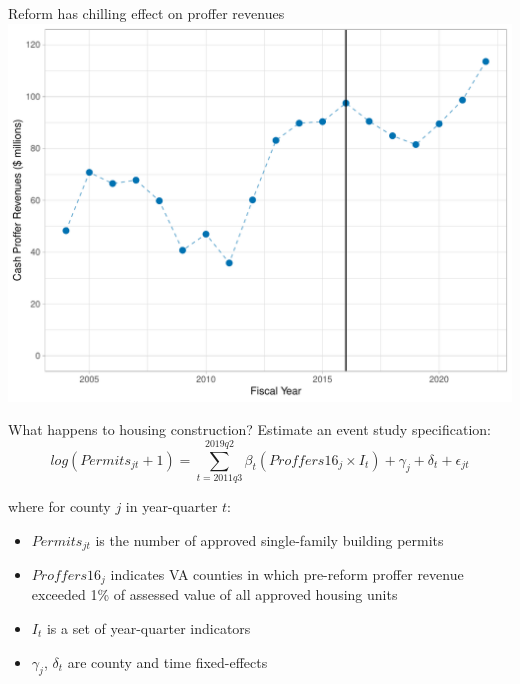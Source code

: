 \documentclass[10pt]{beamer}
\begin{document}
\begin{frame}{Reform has chilling effect on proffer revenues}
    \includegraphics[width=\textwidth]{figures/proffer_revenues.pdf}
\end{frame}

\begin{frame}[t]{What happens to housing construction?}
    Estimate an event study specification: $$log(Permits_{jt} + 1) = \sum_{t=2011q3}^{2019q2}\beta_t(Proffers16_j \times I_t) + \gamma_j + \delta_t + \epsilon_{jt}$$

    where for county $j$ in year-quarter $t$:
    \begin{itemize}
        \item $Permits_{jt}$ is the number of approved single-family building permits
        \item $Proffers16_j$ indicates VA counties in which pre-reform proffer revenue exceeded 1\% of assessed value of all approved housing units 
        \item $I_t$ is a set of year-quarter indicators
        \item $\gamma_j$, $\delta_t$ are county and time fixed-effects
    \end{itemize}
    
\end{frame}
\end{document}
